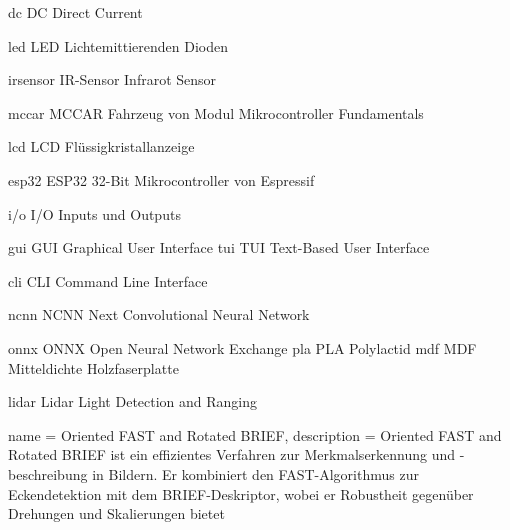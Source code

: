 \newacronym
  {dc}                 %
  {DC}                %
  {Direct Current}  %


\newacronym
  {led}                 %
  {LED}                %
  {Lichtemittierenden Dioden}  %


\newacronym
  {irsensor}                 %
  {IR-Sensor}                %
  {Infrarot Sensor}  %

\newacronym
  {mccar}                 %
  {MCCAR}                %
  {Fahrzeug von Modul Mikrocontroller Fundamentals}  %


\newacronym
  {lcd}                 %
  {LCD}                %
  {Flüssigkristallanzeige}  %



\newacronym
  {esp32}                 %
  {ESP32}                %
  {32-Bit Mikrocontroller von Espressif}  %

\newacronym
  {i/o}                 %
  {I/O}                %
  {Inputs und Outputs}  %

\newacronym
  {gui}                 %
  {GUI}                %
  {Graphical User Interface}  %
  \newacronym
  {tui}                 %
  {TUI}                %
  {Text-Based User Interface}  %

\newacronym
  {cli}
  {CLI}
  {Command Line Interface} 

\newacronym
  {ncnn}
  {NCNN}
  {Next Convolutional Neural Network} 

  \newacronym
  {onnx}
  {ONNX}
  {Open Neural Network Exchange} 
\newacronym
    {pla}
    {PLA}
    {Polylactid}
\newacronym
    {mdf}
    {MDF}
    {Mitteldichte Holzfaserplatte}
  
  

\newacronym
  {lidar}             %
  {Lidar}                      %
  {Light Detection and Ranging}             %



{
  name = Oriented FAST and Rotated BRIEF,
  description = {
 Oriented FAST and Rotated BRIEF ist ein effizientes Verfahren zur Merkmalserkennung und -beschreibung in Bildern. Er kombiniert den FAST-Algorithmus zur Eckendetektion mit dem BRIEF-Deskriptor, wobei er Robustheit gegenüber Drehungen und Skalierungen bietet
  }
}


